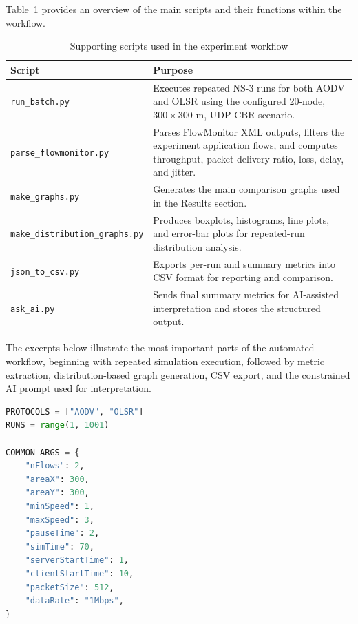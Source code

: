 \documentclass{Academic}
\begin{document}
Table~\ref{tab:scripts} provides an overview of the main scripts and their functions within the workflow.

\begin{table}[htbp]
\centering
\caption{Supporting scripts used in the experiment workflow}
\label{tab:scripts}
\begin{tabular}{lp{9cm}}
\toprule
\textbf{Script} & \textbf{Purpose} \\
\midrule
\texttt{run\_batch.py} & Executes repeated NS-3 runs for both AODV and OLSR using the configured 20-node, \(300 \times 300\) m, UDP CBR scenario. \\
\texttt{parse\_flowmonitor.py} & Parses FlowMonitor XML outputs, filters the experiment application flows, and computes throughput, packet delivery ratio, loss, delay, and jitter. \\
\texttt{make\_graphs.py} & Generates the main comparison graphs used in the Results section. \\
\texttt{make\_distribution\_graphs.py} & Produces boxplots, histograms, line plots, and error-bar plots for repeated-run distribution analysis. \\
\texttt{json\_to\_csv.py} & Exports per-run and summary metrics into CSV format for reporting and comparison. \\
\texttt{ask\_ai.py} & Sends final summary metrics for AI-assisted interpretation and stores the structured output. \\
\bottomrule
\end{tabular}
\end{table}

The excerpts below illustrate the most important parts of the automated workflow, beginning with repeated simulation execution, followed by metric extraction, distribution-based graph generation, CSV export, and the constrained AI prompt used for interpretation.

\begin{lstlisting}[language=Python, caption={Excerpt from \texttt{run\_batch.py} showing repeated execution settings}]
PROTOCOLS = ["AODV", "OLSR"]
RUNS = range(1, 1001)

COMMON_ARGS = {
    "nFlows": 2,
    "areaX": 300,
    "areaY": 300,
    "minSpeed": 1,
    "maxSpeed": 3,
    "pauseTime": 2,
    "simTime": 70,
    "serverStartTime": 1,
    "clientStartTime": 10,
    "packetSize": 512,
    "dataRate": "1Mbps",
}
\end{lstlisting}
\end{document}
